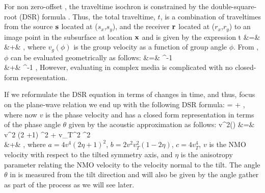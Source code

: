 For non zero-offset , the traveltime isochron is constrained by the
double-square-root (DSR) formula \cite[]{Claerbout.bei.95}. Thus, the
total traveltime, $t$, is a combination of traveltimes from the source
$\ss$ located at ($s_x$,$s_y$), and the receiver $\rr$ located at
($r_x$,$r_y$) to an image point in the subsurface at location $\xx$ and is
given by the expression
%
\bea \label{eqn:dsr}
t &=&  \nonumber \\
  &+&  \;,
\eea
%
where $v_g(\phi)$ is the group velocity as a function of group angle
$\phi$. From ,  $\phi$ can be evaluated geometrically
as follows:
%
\bea \label{eqn:dsr2}
\phi 
&=&  \cos^{-1}{}
\nonumber \\
&+&  \cos^{-1}{} 
\;,
\eea
%
 However, evaluating   in complex media is complicated with no
closed-form representation. 

If we reformulate the DSR equation in terms of changes in time, and
thus, focus on the plane-wave relation we end up with the following
DSR formula:
%
\beq \label{eqn:3p7}
 = 
 + 
 \;,
\eeq
%
where now $v$ is the phase velocity and has a closed form
representation in terms of the phase angle $\theta$  given by the
acoustic approximation \cite[]{GEO63-02-06230631} as follows:
%
\bea \label{eqn:vp2}
v^2(\theta)
&=&  
\lp v^2   (2 \eta +1) \sin^2 \theta  +
    v_T^2           \cos^2 \theta \rp \nonumber \\
&+& 
\;,
\eea
%
where 
$a=4 v^4 (2\eta +1)^2$, $b=2 v^2 v_T^2 (1-2\eta )$, $c=4 v_T^4$,
$v$ is the NMO velocity with respect to the tilted symmetry axis, and
$\eta$ is the anisotropy parameter relating the NMO velocity to the
velocity normal to the tilt. The angle $\theta$ in  is
measured from the tilt direction and will also be given by the angle
gather as part of the process 
 as we will see later.

